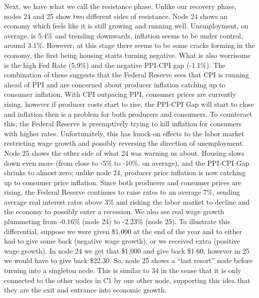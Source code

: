 \documentclass[10pt, letterpaper]{article}
\begin{document}
Next, we have what we call the resistance phase. Unlike our recovery
phase, nodes 24 and 25 show two different sides of resistance. Node 24
shows an economy which feels like it is still growing and running well.
Unemployment, on average, is 5.4\% and trending downwards, inflation
seems to be under control, around 3.1\%. However, at this stage there
seems to be some cracks forming in the economy, the first being housing
starts turning negative. What is also worrisome is the high Fed Rate
(5.9\%) and the negative PPI-CPI gap (-1.1\%). The combination of these
suggests that the Federal Reserve sees that CPI is running ahead of PPI
and are concerned about producer inflation catching up to consumer
inflation. With CPI outpacing PPI, consumer prices are currently rising,
however if producer costs start to rise, the PPI-CPI Gap will start to
close and inflation then is a problem for both producers and consumers.
To counteract this, the Federal Reserve is preemptively trying to kill
inflation for consumers with higher rates. Unfortunately, this has
knock-on effects to the labor market restricting wage growth and
possibly reversing the direction of unemployment. Node 25 shows the
other side of what 24 was warning us about. Housing slows down even more
(from close to -5\% to -10\%, on average), and the PPI-CPI Gap shrinks
to almost zero; unlike node 24, producer price inflation is now catching
up to consumer price inflation. Since both producers and consumer prices
are rising, the Federal Reserve continues to raise rates to an average
7\%, sending average real interest rates above 3\% and risking the labor
market to decline and the economy to possibly enter a recession. We also
see real wage growth plummeting from -0.16\% (node 24) to -2.23\% (node
25). To illustrate this differential, suppose we were given \$1,000 at
the end of the year and to either had to give some back (negative wage
growth), or we received extra (positive wage growth). In node 24 we get
that \$1,000 and give back \$1.60, however in 25 we would have to give
back \$22.30. So, node 25 shows a ``last resort'' node before turning
into a singleton node. This is similar to 34 in the sense that it is
only connected to the other nodes in C1 by one other node, supporting
this idea that they are the exit and entrance into economic growth.
\end{document}
